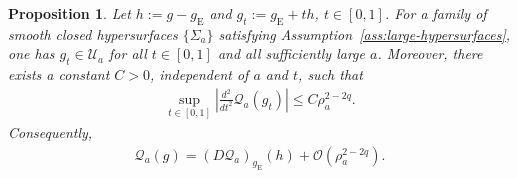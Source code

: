 \documentclass[10pt]{amsart}
\newcommand{\gE}{g_{\mathrm{E}}}
\theoremstyle{plain}
\newtheorem{proposition}[theorem]{Proposition}
\theoremstyle{remark}
\begin{document}
	\begin{proposition}\label{prop:BY-uniform-quadratic-remainder}
		Let $h:=g-\gE$ and $g_t:=\gE+t h$, $t\in[0,1]$. For a family of smooth closed hypersurfaces $\{\Sigma_a\}$ satisfying Assumption~\ref{ass:large-hypersurfaces}, one has
		$g_t\in\mathcal U_a$ for all $t\in [0,1]$ and all sufficiently large $a$. Moreover, there exists a constant $C>0$, independent of $a$ and
		$t$, such that
		\begin{align}\label{eq:BY-uniform-quadratic-remainder}
			\sup_{t\in[0,1]}
			\left|
			\frac{d^2}{dt^2}\mathcal Q_a(g_t)
			\right|
			\leq
			C\rho_a^{2-2q}.
		\end{align}
		Consequently,
		\begin{align}\label{eq:BY-Qa-Taylor-without-regularity}
			\mathcal Q_a(g)
			=
			(D\mathcal Q_a)_{\gE}(h)
			+
			\mathcal O(\rho_a^{2-2q}).
		\end{align}
	\end{proposition}
	
\end{document}
